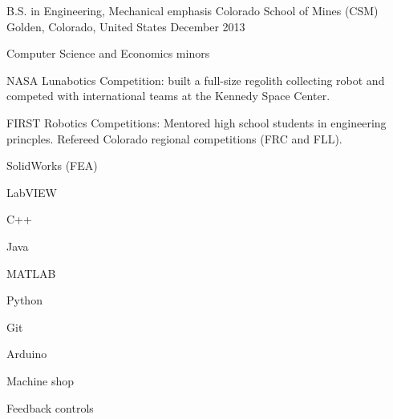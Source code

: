 

\begin{cventries}

  \cventry
    {B.S. in Engineering, Mechanical emphasis} %
    {Colorado School of Mines (CSM)} %
    {Golden, Colorado, United States} %
    {December 2013} %
    {%
      \begin{cvitems} %
        \item{Computer Science and Economics minors}
        \item{NASA Lunabotics Competition: built a full-size regolith collecting robot and competed with international teams at the Kennedy Space Center.}
        \item{FIRST Robotics Competitions: Mentored high school students in engineering princples. Refereed Colorado regional competitions (FRC and FLL).}
      \end{cvitems}
    }
    \begin{cventryskills}
    \item SolidWorks (FEA)
      \item LabVIEW
      \item C++
      \item Java
      \item MATLAB
      \item Python
      \item Git
      \item Arduino
      \item Machine shop
      \item Feedback controls
    \end{cventryskills}

\end{cventries}
